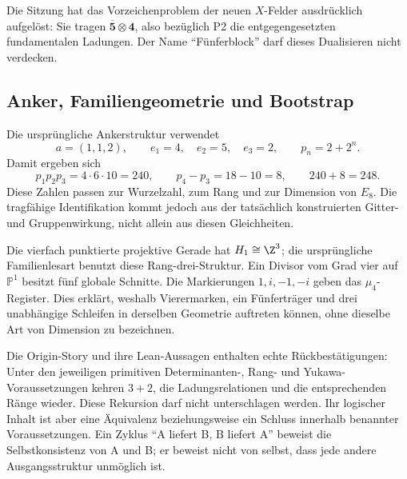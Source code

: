 Die Sitzung hat das Vorzeichenproblem der neuen $X$-Felder ausdrücklich aufgelöst: Sie tragen $\overline{\mathbf5}\otimes\mathbf4$, also bezüglich P2 die entgegengesetzten fundamentalen Ladungen. Der Name ``Fünferblock'' darf dieses Dualisieren nicht verdecken.

\subsection{Anker, Familiengeometrie und Bootstrap}
Die ursprüngliche Ankerstruktur verwendet
\begin{equation}
a=(1,1,2),\qquad e_1=4,\quad e_2=5,\quad e_3=2,
\qquad p_n=2+2^n.
\end{equation}
Damit ergeben sich
\begin{equation}
p_1p_2p_3=4\cdot6\cdot10=240,\qquad p_4-p_3=18-10=8,
\qquad 240+8=248.
\end{equation}
Diese Zahlen passen zur Wurzelzahl, zum Rang und zur Dimension von $E_8$. Die tragfähige Identifikation kommt jedoch aus der tatsächlich konstruierten Gitter- und Gruppenwirkung, nicht allein aus diesen Gleichheiten.

Die vierfach punktierte projektive Gerade hat $H_1\cong\Z^3$; die ursprüngliche Familienlesart benutzt diese Rang-drei-Struktur. Ein Divisor vom Grad vier auf $\mathbb P^1$ besitzt fünf globale Schnitte. Die Markierungen $1,i,-1,-i$ geben das $\mu_4$-Register. Dies erklärt, weshalb Vierermarken, ein Fünferträger und drei unabhängige Schleifen in derselben Geometrie auftreten können, ohne dieselbe Art von Dimension zu bezeichnen.

Die Origin-Story und ihre Lean-Aussagen enthalten echte Rückbestätigungen: Unter den jeweiligen primitiven Determinanten-, Rang- und Yukawa-Voraussetzungen kehren $3+2$, die Ladungsrelationen und die entsprechenden Ränge wieder. Diese Rekursion darf nicht unterschlagen werden. Ihr logischer Inhalt ist aber eine Äquivalenz beziehungsweise ein Schluss innerhalb benannter Voraussetzungen. Ein Zyklus ``A liefert B, B liefert A'' beweist die Selbstkonsistenz von A und B; er beweist nicht von selbst, dass jede andere Ausgangsstruktur unmöglich ist.


